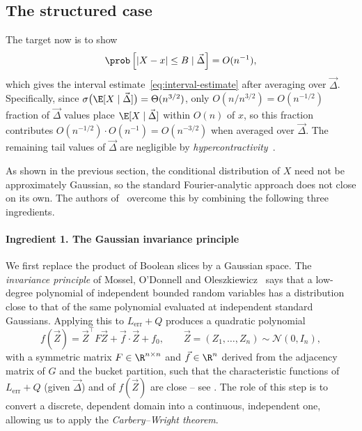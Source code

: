 \subsection{The structured case}
\label{sec:robust-rank}

The target now is to show
\begin{equation}
\label{eq:conditional-target}
  \prob\left[|X - x| \leq B \mid \vec\Delta\right] = O(n^{-1}),
\end{equation}
which gives the interval estimate~\eqref{eq:interval-estimate} after averaging over $\vec\Delta$. Specifically, since $\sigma\bigl(\E[X \mid \vec \Delta]\bigr) = \Theta(n^{3/2})$, only $O(n/n^{3/2}) = O(n^{-1/2})$ fraction of $\vec \Delta$ values place $\E[X \mid \vec\Delta]$ within $O(n)$ of $x$, so this fraction contributes $O(n^{-1/2}) \cdot O(n^{-1}) = O(n^{-3/2})$ when averaged over $\vec\Delta$. The remaining tail values of $\vec \Delta$ are negligible by \textit{hypercontractivity}~\cite[Theorem 4.15]{Kwan_2023}. 

As shown in the previous section, the conditional distribution of $X$ need not be approximately Gaussian, so the standard Fourier-analytic approach does not close on its own. The authors of~\cite{Kwan_2023} overcome this by combining the following three ingredients.

\paragraph{Ingredient 1. The Gaussian invariance principle}

We first replace the product of Boolean slices by a Gaussian space. The \textit{invariance principle} of Mossel, O'Donnell and Oleszkiewicz~\cite{mossel2005noisestabilityfunctionslow} says that a low-degree polynomial of independent bounded random variables has a distribution close to that of the same polynomial evaluated at independent standard Gaussians. Applying this to $L_{\text{err}} + Q$ produces a quadratic polynomial
\begin{equation}
\label{eq:gaussian-quadratic}
  f(\vec Z) = \vec Z^{\top} F \vec Z + \vec f \cdot \vec Z + f_0, \qquad \vec Z = (Z_1, \dots, Z_n) \sim \mathcal{N}(0, I_n),
\end{equation}
with a symmetric matrix $F \in \R^{n \times n}$ and $\vec f \in \R^n$ derived from the adjacency matrix of $G$ and the bucket partition, such that the characteristic functions of $L_{\text{err}} + Q$ (given $\vec\Delta$) and of $f(\vec Z)$ are close -- see \cite[Lemma~11.1]{Kwan_2023}. The role of this step is to convert a discrete, dependent domain into a continuous, independent one, allowing us to apply the \textit{Carbery--Wright theorem}.

